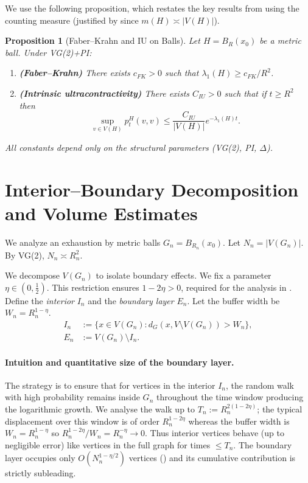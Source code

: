 \documentclass{article}
\numberwithin{equation}{section}
\newtheorem{proposition}[theorem]{Proposition}
\theoremstyle{definition}
\theoremstyle{remark}
\begin{document}
We use the following proposition, which restates the key results from  using the counting measure (justified by  since $m(H) \asymp |V(H)|$).

\begin{proposition}[Faber--Krahn and IU on Balls]\label{prop:IU}
Let $H=B_R(x_0)$ be a metric ball. Under VG(2)+PI:
\begin{enumerate}
    \item \textbf{(Faber--Krahn)} There exists $c_{FK}>0$ such that $\lambda_1(H)\ge c_{FK}/R^{2}$.
    \item \textbf{(Intrinsic ultracontractivity)} There exists $C_{IU}>0$ such that if $t\ge R^{2}$ then
    \begin{equation}\label{eq:IU}
        \sup_{v \in V(H)} p_t^H(v,v) \leq \frac{C_{IU}}{|V(H)|} e^{-\lambda_1(H) t}.
    \end{equation}
\end{enumerate}
All constants depend only on the structural parameters (VG(2), PI, $\Delta$).
\end{proposition}

\section{Interior--Boundary Decomposition and Volume Estimates}\label{sec:decomposition}

We analyze an exhaustion by metric balls $G_n = B_{R_n}(x_0)$. Let $N_n = |V(G_n)|$. By VG(2), $N_n \asymp R_n^2$.

We decompose $V(G_n)$ to isolate boundary effects.
We fix a parameter $\eta \in (0, \tfrac{1}{2})$. This restriction ensures $1-2\eta>0$, required for the analysis in . Define the \emph{interior} $I_n$ and the \emph{boundary layer} $E_n$. Let the buffer width be $W_n = R_n^{1-\eta}$.
\begin{align*}
I_n &:= \{x \in V(G_n) : d_G(x, V \setminus V(G_n)) > W_n\}, \\
E_n &:= V(G_n) \setminus I_n.
\end{align*}

\paragraph{Intuition and quantitative size of the boundary layer.} The strategy is to ensure that for vertices in the interior $I_n$, the random walk with high probability remains inside $G_n$ throughout the time window producing the logarithmic growth. We analyse the walk up to $T_n:=R_n^{2(1-2\eta)}$; the typical displacement over this window is of order $R_n^{1-2\eta}$ whereas the buffer width is $W_n=R_n^{1-\eta}$ so $R_n^{1-2\eta}/W_n=R_n^{-\eta}\to0$. Thus interior vertices behave (up to negligible error) like vertices in the full graph for times $\le T_n$. The boundary layer occupies only $O(N_n^{1-\eta/2})$ vertices () and its cumulative contribution is strictly subleading.
\end{document}
